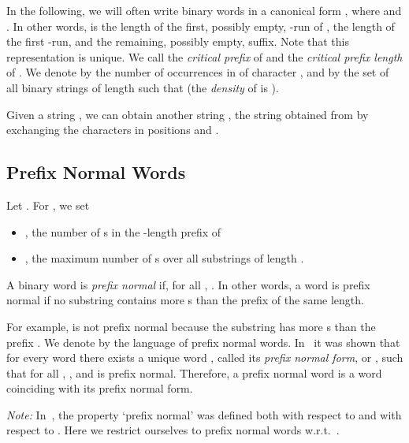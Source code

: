 \documentclass[11pt,a4paper]{llncs}
\begin{document}
In the following, we will often write binary words  in a canonical form , where  and . In other words,  is the length of the first, possibly empty, -run of ,  the length of the first -run, and  the remaining, possibly empty, suffix. Note that this representation is unique. We call  the {\em critical prefix} of  and  the {\em critical prefix length} of . We denote by  the number of occurrences in  of character , and by  the set of all binary strings  of length  such that  (the  {\em density} of  is ). 

Given a string , we can obtain another string , the string obtained from  by exchanging the characters in positions  and . 

\subsection{Prefix Normal Words}\label{sec:pnw}

Let . For , we set 
\begin{itemize}
\item , the number of s in the -length prefix of 
\item , the maximum number of s over all substrings of length . 
\end{itemize}

\begin{definition} 
A binary word  is {\em prefix normal} if, for all , . In other words, a word is prefix normal if no substring contains more s than the prefix of the same length.
\end{definition}

For example,  is not prefix normal because the substring  has more s than the prefix . We denote by  the language of prefix normal words. In~\cite{FL11} it was shown that for every word  there exists a unique word , called its {\em prefix normal form}, or , such that for all , , and  is prefix normal. Therefore, a prefix normal word is a word coinciding with its prefix normal form.

{\em Note:} In~\cite{FL11}, the property `prefix normal' was defined both with respect to  and with respect to . Here we restrict ourselves to prefix normal words w.r.t.\ .
\end{document}
